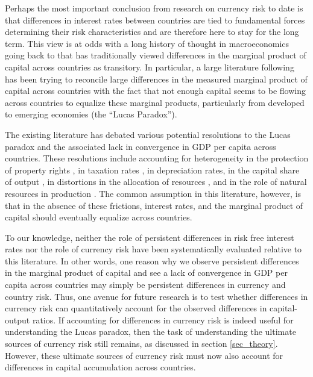 \documentclass{ar-1col}
\begin{document}
Perhaps the most important conclusion from research on currency risk to date is that differences in interest rates between countries are tied to fundamental forces determining their risk characteristics and are therefore here to stay for the long term. This view is at odds with a long history of thought in macroeconomics going back to \cite{solow1956contribution} that has traditionally viewed differences in the marginal product of capital across countries as transitory. In particular, a large literature following \citet{Lucas1990} has been trying to reconcile large differences in the measured marginal product of capital across countries with the fact that not enough capital seems to be flowing across countries to equalize these marginal products, particularly from developed to emerging economies (the ``Lucas Paradox''). 

The existing literature has debated various potential resolutions to the Lucas paradox and the associated lack in convergence in GDP per capita across countries. These resolutions include accounting for heterogeneity in the protection of property rights \citep{HallJones1997}, in taxation rates \citep{Jorgenson1996}, in depreciation rates, in the capital share of output \citep{Neiman2014}, in distortions in the allocation of resources \citep{HsiehKlenow2009}, and in the role of natural resources in production \citep{CaselliFeyrer2007, Monge-Naranjoetal2019}.  The common assumption in this literature, however, is that in the absence of these frictions, interest rates, and the marginal product of capital should eventually equalize across countries.

To our knowledge, neither the role of persistent differences in risk free interest rates nor the role of currency risk have been systematically evaluated relative to this literature. In other words, one reason why we observe persistent differences in the marginal product of capital and see a lack of convergence in GDP per capita across countries may simply be persistent differences in currency and country risk. Thus, one avenue for future research is to test whether differences in currency risk can quantitatively account for the observed differences in capital-output ratios. If accounting for differences in currency risk is indeed useful for understanding the Lucas paradox, then the task of understanding the ultimate sources of currency risk still remains, as discussed in section \ref{sec_theory}. However, these ultimate sources of currency risk must now also account for differences in capital accumulation across countries. 
\end{document}
